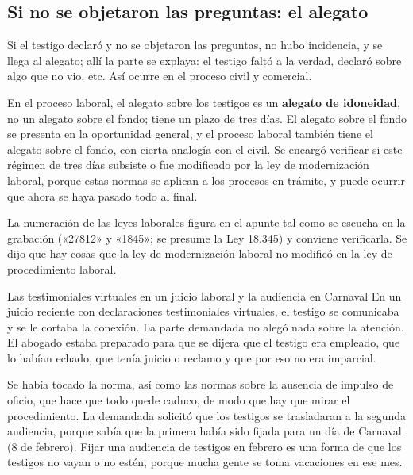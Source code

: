 \documentclass[12pt,oneside]{book}
\begin{document}
\subsection{Si no se objetaron las preguntas: el alegato}

Si el testigo declaró y no se objetaron las preguntas, no hubo incidencia, y se llega al alegato; allí la parte se explaya: el testigo faltó a la verdad, declaró sobre algo que no vio, etc. Así ocurre en el proceso civil y comercial.

En el proceso laboral, el alegato sobre los testigos es un \textbf{alegato de idoneidad}, no un alegato sobre el fondo; tiene un plazo de tres días. El alegato sobre el fondo se presenta en la oportunidad general, y el proceso laboral también tiene el alegato sobre el fondo, con cierta analogía con el civil. Se encargó verificar si este régimen de tres días subsiste o fue modificado por la ley de modernización laboral, porque estas normas se aplican a los procesos en trámite, y puede ocurrir que ahora se haya pasado todo al final.

\begin{note}
La numeración de las leyes laborales figura en el apunte tal como se escucha en la grabación («27812» y «1845»; se presume la Ley 18.345) y conviene verificarla. Se dijo que hay cosas que la ley de modernización laboral no modificó en la ley de procedimiento laboral.
\end{note}

\begin{example}{Las testimoniales virtuales en un juicio laboral y la audiencia en Carnaval}
En un juicio reciente con declaraciones testimoniales virtuales, el testigo se comunicaba y se le cortaba la conexión. La parte demandada no alegó nada sobre la atención. El abogado estaba preparado para que se dijera que el testigo era empleado, que lo habían echado, que tenía juicio o reclamo y que por eso no era imparcial.

Se había tocado la norma, así como las normas sobre la ausencia de impulso de oficio, que hace que todo quede caduco, de modo que hay que mirar el procedimiento. La demandada solicitó que los testigos se trasladaran a la segunda audiencia, porque sabía que la primera había sido fijada para un día de Carnaval (8 de febrero). Fijar una audiencia de testigos en febrero es una forma de que los testigos no vayan o no estén, porque mucha gente se toma vacaciones en ese mes.
\end{example}
\end{document}
